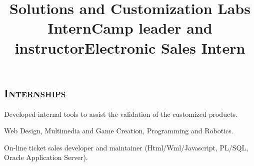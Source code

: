 \documentclass[line,margin]{res}
\begin{document}
\begin{resume}
%

\section{\textsc{Internships}}

\title{Solutions and Customization Labs Intern}
\begin{position}
Developed internal tools to assist the validation of the customized products.
\end{position}

\title{Camp leader and instructor}
\begin{position}
Web Design, Multimedia and Game Creation, Programming and Robotics.
\end{position}

\title{Electronic Sales Intern}
\begin{position}
On-line ticket sales developer and maintainer (Html/Wml/Javascript, PL/SQL, Oracle Application Server).
\end{position}


\end{resume}
\end{document}
